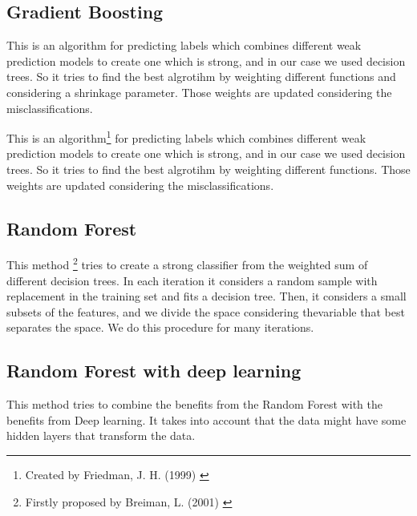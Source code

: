 \documentclass[paper=a4, fontsize=12pt]{scrartcl}
\numberwithin{equation}{section}
\numberwithin{figure}{section}
\numberwithin{table}{section}
\begin{document}
\subsection{Gradient Boosting}
This is an algorithm for predicting labels which combines different weak prediction models to create one which is strong, and in our case we used decision trees. So it tries to find the best algrotihm by weighting different functions and considering a shrinkage parameter. Those weights are updated considering the misclassifications. 

This is an algorithm\footnote{Created by Friedman, J. H. (1999) \cite{Friedman00greedyfunction}} for predicting labels which combines different weak prediction models to create one which is strong, and in our case we used decision trees. So it tries to find the best algrotihm by weighting different functions. Those weights are updated considering the misclassifications. 


\subsection{Random Forest}
This method \footnote{Firstly proposed by Breiman, L. (2001) \cite{random} } tries to create a strong classifier from the weighted sum of different decision trees. In each iteration it considers a random sample with replacement in the training set and fits a decision tree. Then, it considers a small subsets of the features, and we divide the space considering thevariable that best separates the space. We do this procedure for many iterations. 


\subsection{Random Forest with deep learning}
This  method tries to combine the benefits from the Random Forest with the benefits from Deep learning. It takes into account that the data might have some hidden layers that transform the data. 



\newpage




\end{document}
